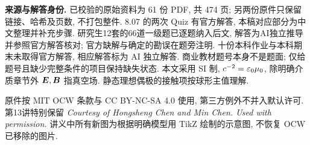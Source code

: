 \noindent\textbf{来源与解答身份.} 已校验的原始资料为 61 份 PDF, 共 474 页; 另两份原件只保留链接、哈希及页数, 不打包整件. 8.07 的两次 Quiz 有官方解答, 本稿对应部分为中文整理并补充步骤. 研究生12套的66道一级题已逐题纳入后文, 解答为AI独立推导并参照官方解答核对; 官方缺解与确定的勘误在题旁注明. 十份本科作业与本科期末未取得官方解答, 相应解答标为 AI 独立解答. 商业教材题号本身不是题面; 仅给题号且缺少完整条件的项目保持缺失状态. 本文采用 SI 制, $c^{-2}=\varepsilon_0\mu_0$, 除明确介质章节外 $\boldsymbol{E},\boldsymbol{B}$ 指真空场. 静态理想偶极的接触项按球形主值理解.

原件按 MIT OCW 条款与 CC BY-NC-SA 4.0 使用, 第三方例外不并入默认许可. 第13讲特别保留 \textit{Courtesy of Hongsheng Chen and Min Chen. Used with permission.} 讲义中所有新图为根据明确模型用 TikZ 绘制的示意图, 不恢复 OCW 已移除的图片.
